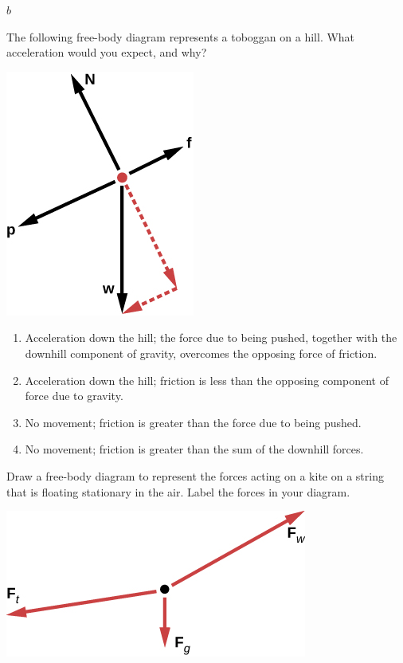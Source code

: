 \documentclass[
]{book}
\providecommand{\tightlist}{%
  \setlength{\itemsep}{0pt}\setlength{\parskip}{0pt}}
\begin{document}
\leavevmode{}%
\(b\)

\hypertarget{fs-id1624568}{}
\leavevmode{}%
The following free-body diagram represents a toboggan on a hill. What
acceleration would you expect, and why?

\includegraphics{images/Figure_04_05_12.jpg}

\begin{enumerate}
\def\labelenumi{\alph{enumi}.}
\tightlist
\item
  Acceleration down the hill; the force due to being pushed, together
  with the downhill component of gravity, overcomes the opposing force
  of friction.
\item
  Acceleration down the hill; friction is less than the opposing
  component of force due to gravity.
\item
  No movement; friction is greater than the force due to being pushed.
\item
  No movement; friction is greater than the sum of the downhill
  forces.
\end{enumerate}

\hypertarget{fs-id2298446}{}
\leavevmode{}%
Draw a free-body diagram to represent the forces acting on a kite on a
string that is floating stationary in the air. Label the forces in your
diagram.

\leavevmode{}%
\includegraphics{images/Figure_04_05_13.jpg}
\end{document}
